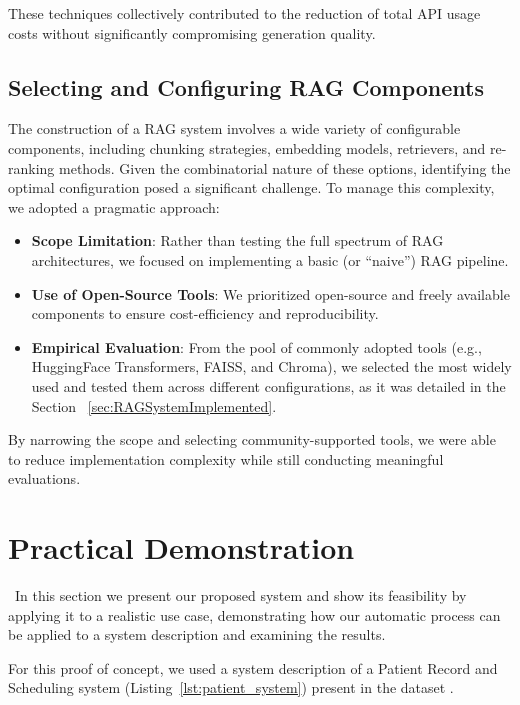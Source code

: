 These techniques collectively contributed to the reduction of total API usage costs without significantly compromising generation quality.

\subsection{Selecting and Configuring RAG Components}

The construction of a RAG system involves a wide variety of configurable components, including chunking strategies, embedding models, retrievers, and re-ranking methods. Given the combinatorial nature of these options, identifying the optimal configuration posed a significant challenge.
To manage this complexity, we adopted a pragmatic approach:
\begin{itemize}
    \item \textbf{Scope Limitation}: Rather than testing the full spectrum of RAG architectures, we focused on implementing a basic (or ``naive'') RAG pipeline.
    \item \textbf{Use of Open-Source Tools}: We prioritized open-source and freely available components to ensure cost-efficiency and reproducibility.
    \item \textbf{Empirical Evaluation}: From the pool of commonly adopted tools (e.g., HuggingFace Transformers, FAISS, and Chroma), we selected the most widely used and tested them across different configurations, as it was detailed in the Section ~\ref{sec:RAGSystemImplemented}.
\end{itemize}

By narrowing the scope and selecting community-supported tools, we were able to reduce implementation complexity while still conducting meaningful evaluations.


\section{Practical Demonstration}
\label{sec:praticalDemonstration}\
In this section we present our proposed system and show its feasibility by applying it to a realistic use case, demonstrating how our automatic process can be applied to a system description and examining the results.

For this proof of concept, we used a system description of a Patient Record and Scheduling system (Listing~\ref{lst:patient_system}) present in the dataset \cite{DatasetDeBari2024}.

